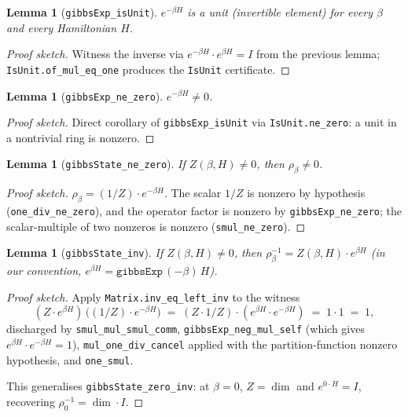 \documentclass[a4paper,11pt]{article}
\newtheorem{lemma}[theorem]{Lemma}
\begin{document}
\begin{lemma}[\texttt{gibbsExp\_isUnit}]
$e^{-\beta H}$ is a unit (invertible element) for every $\beta$ and
every Hamiltonian $H$.
\end{lemma}

\begin{proof}[Proof sketch]
Witness the inverse via $e^{-\beta H} \cdot e^{\beta H} = I$ from the
previous lemma; \texttt{IsUnit.of\_mul\_eq\_one} produces the
\texttt{IsUnit} certificate.
\end{proof}

\begin{lemma}[\texttt{gibbsExp\_ne\_zero}]
$e^{-\beta H} \neq 0$.
\end{lemma}

\begin{proof}[Proof sketch]
Direct corollary of \texttt{gibbsExp\_isUnit} via
\texttt{IsUnit.ne\_zero}: a unit in a nontrivial ring is nonzero.
\end{proof}

\begin{lemma}[\texttt{gibbsState\_ne\_zero}]
If $Z(\beta, H) \neq 0$, then $\rho_\beta \neq 0$.
\end{lemma}

\begin{proof}[Proof sketch]
$\rho_\beta = (1/Z) \cdot e^{-\beta H}$.  The scalar $1/Z$ is nonzero
by hypothesis (\texttt{one\_div\_ne\_zero}), and the operator factor
is nonzero by \texttt{gibbsExp\_ne\_zero}; the scalar-multiple of
two nonzeros is nonzero (\texttt{smul\_ne\_zero}).
\end{proof}

\begin{lemma}[\texttt{gibbsState\_inv}]
If $Z(\beta, H) \neq 0$, then
$\rho_\beta^{-1} = Z(\beta, H) \cdot e^{\beta H}$
(in our convention, $e^{\beta H} = \texttt{gibbsExp}\,(-\beta)\,H$).
\end{lemma}

\begin{proof}[Proof sketch]
Apply \texttt{Matrix.inv\_eq\_left\_inv} to the witness
\[
  (Z \cdot e^{\beta H})\,\bigl((1/Z) \cdot e^{-\beta H}\bigr)
  \;=\;
  (Z \cdot 1/Z) \cdot (e^{\beta H} \cdot e^{-\beta H})
  \;=\; 1 \cdot 1 \;=\; 1,
\]
discharged by \texttt{smul\_mul\_smul\_comm},
\texttt{gibbsExp\_neg\_mul\_self} (which gives
$e^{\beta H}\cdot e^{-\beta H} = 1$), \texttt{mul\_one\_div\_cancel}
applied with the partition-function nonzero hypothesis, and
\texttt{one\_smul}.

This generalises \texttt{gibbsState\_zero\_inv}: at $\beta = 0$,
$Z = \dim$ and $e^{0 \cdot H} = I$, recovering $\rho_0^{-1} = \dim \cdot I$.
\end{proof}
\end{document}
